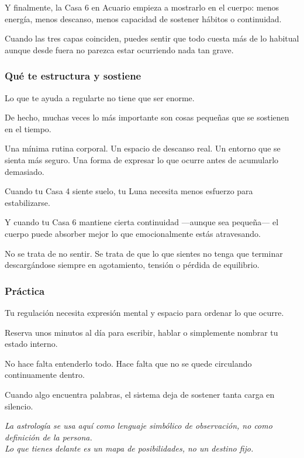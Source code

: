 \documentclass[11pt,a4paper]{article}
\begin{document}
Y finalmente, la Casa 6 en Acuario empieza a mostrarlo en el cuerpo:
menos energía,
menos descanso,
menos capacidad de sostener hábitos o continuidad.

Cuando las tres capas coinciden, puedes sentir que todo cuesta más de lo habitual aunque desde fuera no parezca estar ocurriendo nada tan grave.

\subsubsection*{Qué te estructura y sostiene}

Lo que te ayuda a regularte no tiene que ser enorme.

De hecho, muchas veces lo más importante son cosas pequeñas que se sostienen en el tiempo.

Una mínima rutina corporal.
Un espacio de descanso real.
Un entorno que se sienta más seguro.
Una forma de expresar lo que ocurre antes de acumularlo demasiado.

Cuando tu Casa 4 siente suelo, tu Luna necesita menos esfuerzo para estabilizarse.

Y cuando tu Casa 6 mantiene cierta continuidad —aunque sea pequeña— el cuerpo puede absorber mejor lo que emocionalmente estás atravesando.

No se trata de no sentir.
Se trata de que lo que sientes no tenga que terminar descargándose siempre en agotamiento, tensión o pérdida de equilibrio.

\subsubsection*{Práctica}

Tu regulación necesita expresión mental y espacio para ordenar lo que ocurre.

Reserva unos minutos al día para escribir, hablar o simplemente nombrar tu estado interno.

No hace falta entenderlo todo.
Hace falta que no se quede circulando continuamente dentro.

Cuando algo encuentra palabras, el sistema deja de sostener tanta carga en silencio.

\vspace{0.6cm}

\begin{center}
{\small\itshape\color{grisai}
La astrología se usa aquí como lenguaje simbólico de observación, no como definición de la persona.\\
Lo que tienes delante es un mapa de posibilidades, no un destino fijo.
}
\end{center}
\end{document}
